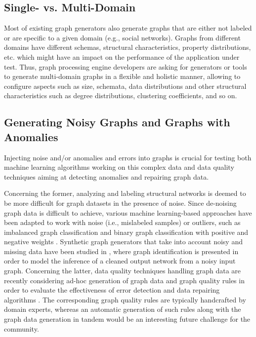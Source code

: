 \subsection{Single- vs. Multi-Domain}

Most of existing graph generators also generate graphs that are either not labeled or
are specific to a given domain (e.g.,  social networks). Graphs from different
domains have different schemas, structural characteristics, property
distributions, etc. which might have an impact on the performance of the
application under test. Thus, graph processing engine developers are asking for
generators or tools to generate multi-domain graphs  in a flexible and holistic manner, allowing to configure aspects
such as size, schemata, data distributions and other structural
characteristics such as degree distributions, clustering coefficients, and
so on.

\subsection{Generating Noisy Graphs and Graphs with Anomalies}
Injecting noise and/or anomalies and errors into graphs is crucial for
testing both machine learning algorithms working on this complex data and
data quality techniques aiming at detecting anomalies and repairing graph
data.

Concerning the former, analyzing and labeling structural networks is
deemed to be more difficult for graph datasets in the presence of noise.
Since de-noising graph data is difficult to achieve, various machine learning-based
approaches have been adapted to work with noise (i.e., mislabeled
samples) or outliers, such as
imbalanced graph classification \cite{PanZ13} and
binary graph classification with positive and negative weights \cite{CheungSML16}.
Synthetic graph generators that take into account noisy and missing data
have been studied in \cite{NamataG10}, where graph identification is presented in
order to  model the inference of a cleaned output network from a
noisy input graph.
Concerning the latter, data quality techniques handling graph data are recently considering ad-hoc
generation of graph data and graph quality rules in order to evaluate the
effectiveness of error detection and data repairing algorithms \cite{FanWX16a,AriouaB18}. The
corresponding graph quality rules are typically handcrafted by domain
experts, whereas an automatic generation of such rules along with the graph
data generation in tandem would be an interesting future challenge for the
community.

